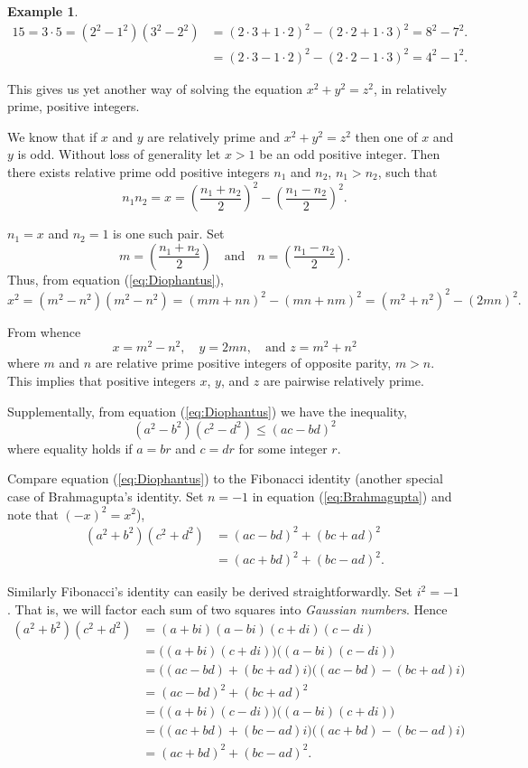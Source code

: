\documentclass{article}
\theoremstyle{definition}
\newtheorem{example}{Example}[section]
\begin{document}
\begin{example}
\[\begin{aligned}
15 = 3\cdot 5 = \left(2^2-1^2\right)\left(3^2-2^2\right) &= \left(2\cdot 3+1\cdot 2\right)^2-\left(2\cdot2 +1\cdot 3\right)^2 = \boxed{8^2-7^2}. \\ &= \left(2\cdot 3-1\cdot 2\right)^2-\left(2\cdot2 -1\cdot 3\right)^2  = \boxed{4^2-1^2}.
\end{aligned}\]
\end{example}

This gives us yet another way of solving the equation \(x^2+y^2=z^2\), in relatively prime, positive integers.

We know that if \(x\) and \(y\) are relatively prime and \(x^2+y^2=z^2\) then one of \(x\) and \(y\) is odd. Without loss of generality let \(x>1\) be an odd positive integer. Then there exists relative prime odd positive integers \(n_1\) and \(n_2\), \(n_1>n_2\), such that \[ n_1n_2 = x = \left(\frac{n_1+n_2}{2}\right)^2 - \left(\frac{n_1-n_2}{2}\right)^2. \]

\(n_1=x\) and \(n_2=1\) is one such pair. Set \[ m = \left(\frac{n_1+n_2}{2}\right) \quad\text{and}\quad
n = \left(\frac{n_1-n_2}{2}\right). \]
Thus, from equation (\ref{eq:Diophantus}), \[ x^2 = (m^2-n^2) (m^2-n^2) = (mm+nn)^2-(mn+nm)^2
= (m^2+n^2)^2-(2mn)^2. \]

From whence \[ x=m^2-n^2, \quad y=2mn, \quad \text{and } z=m^2+n^2 \] where \(m\) and \(n\) are relative prime positive integers of opposite parity, \(m > n\). This implies that positive integers \(x\), \(y\), and \(z\) are pairwise relatively prime.

Supplementally, from equation (\ref{eq:Diophantus}) we have the inequality, \[ (a^2-b^2) (c^2-d^2) \le (ac-bd)^2 \] where equality holds if \(a=br\) and \(c=dr\) for some integer \(r\).

Compare equation (\ref{eq:Diophantus}) to the Fibonacci identity (another special case of Brahmagupta's identity. Set \(n=-1\) in equation (\ref{eq:Brahmagupta}) and note that \((-x)^2=x^2\)), \[\begin{aligned} 
(a^2+b^2)(c^2+d^2) &= (ac-bd)^2+(bc+ad)^2 \\ &= (ac+bd)^2+(bc-ad)^2. 
\end{aligned} \]

Similarly Fibonacci's identity can easily be derived straightforwardly. Set \(i^2=-1\). That is, we will factor each sum of two squares into \textit{Gaussian numbers}. Hence \[\begin{aligned}
(a^2+b^2) (c^2+d^2) &= (a+bi)(a-bi)(c+di)(c-di) \\ &= \big((a+bi)(c+di)\big) \big((a-bi)(c-di)\big) \\ &= \big((ac-bd)+(bc+ad)i\big) \big((ac-bd)-(bc+ad)i\big) \\ &= \boxed{(ac-bd)^2+(bc+ad)^2} \\ &= \big((a+bi)(c-di)\big) \big((a-bi)(c+di)\big) \\ &= \big((ac+bd)+(bc-ad)i\big) \big((ac+bd)-(bc-ad)i\big) \\ &= \boxed{(ac+bd)^2+(bc-ad)^2}.
\end{aligned} \]
\end{document}
